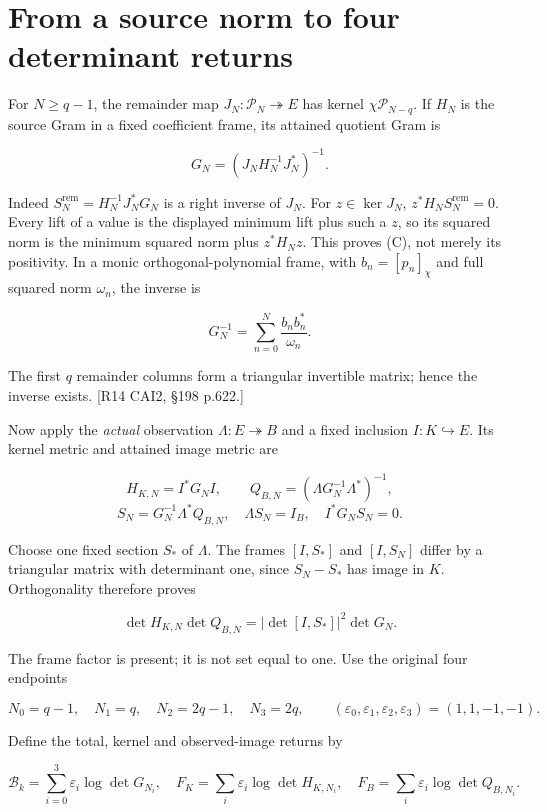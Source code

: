 \section{From a source norm to four determinant returns}\label{from-a-source-norm-to-four-determinant-returns}

For \(N\ge q-1\), the remainder map \(J_N:\mathcal P_N\twoheadrightarrow E\) has kernel \(\chi\mathcal P_{N-q}\). If \(H_N\) is the source Gram in a fixed coefficient frame, its attained quotient Gram is

\[
G_N=(J_NH_N^{-1}J_N^*)^{-1}.
\tag{C}
\]

Indeed \(S_N^{\mathrm{rem}}=H_N^{-1}J_N^*G_N\) is a right inverse of \(J_N\). For \(z\in\ker J_N\), \(z^*H_NS_N^{\mathrm{rem}}=0\). Every lift of a value is the displayed minimum lift plus such a \(z\), so its squared norm is the minimum squared norm plus \(z^*H_Nz\). This proves (C), not merely its positivity. In a monic orthogonal-polynomial frame, with \(b_n=[p_n]_\chi\) and full squared norm \(\omega_n\), the inverse is

\[
G_N^{-1}=\sum_{n=0}^{N}\frac{b_nb_n^*}{\omega_n}.
\]

The first \(q\) remainder columns form a triangular invertible matrix; hence the inverse exists. {[}R14 CAI2, §198 p.622.{]}

Now apply the \emph{actual} observation \(\Lambda:E\twoheadrightarrow B\) and a fixed inclusion \(I:K\hookrightarrow E\). Its kernel metric and attained image metric are

\[
H_{K,N}=I^*G_NI,\qquad
Q_{B,N}=(\Lambda G_N^{-1}\Lambda^*)^{-1},
\] \[
S_N=G_N^{-1}\Lambda^*Q_{B,N},\quad
\Lambda S_N=I_B,\quad I^*G_NS_N=0.
\]

Choose one fixed section \(S_*\) of \(\Lambda\). The frames \([I,S_*]\) and \([I,S_N]\) differ by a triangular matrix with determinant one, since \(S_N-S_*\) has image in \(K\). Orthogonality therefore proves

\[
\det H_{K,N}\det Q_{B,N}
=|\det[I,S_*]|^2\det G_N.
\tag{D}
\]

The frame factor is present; it is not set equal to one. Use the original four endpoints

\[
N_0=q-1,\quad N_1=q,\quad N_2=2q-1,\quad N_3=2q,
\qquad(\varepsilon_0,\varepsilon_1,\varepsilon_2,\varepsilon_3)
=(1,1,-1,-1).
\]

Define the total, kernel and observed-image returns by

\[
\mathcal B_k=\sum_{i=0}^3\varepsilon_i\log\det G_{N_i},\quad
F_K=\sum_i\varepsilon_i\log\det H_{K,N_i},\quad
F_B=\sum_i\varepsilon_i\log\det Q_{B,N_i}.
\]

